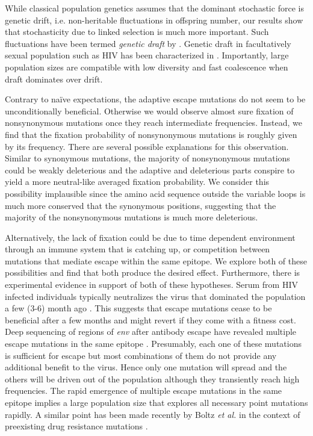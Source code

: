 \documentclass[rmp, twocolumn]{revtex4}
\newcommand{\env}{\textit{env}}
\begin{document}
While classical population genetics assumes that the dominant stochastic force
is genetic drift, i.e. non-heritable fluctuations in offspring number, our
results show that stochasticity due to linked selection is much more important.
Such fluctuations have been termed \emph{genetic draft} by
\citet{gillespie_genetic_2000}. Genetic draft in facultatively sexual population
such as HIV has been characterized in \citep{neher_genetic_2011}. Importantly,
large population sizes are compatible with low diversity and fast coalescence
when draft dominates over drift.

Contrary to na\"ive expectations, the adaptive escape mutations do not seem to
be unconditionally beneficial. Otherwise we would observe almost sure fixation
of nonsynonymous mutations once they reach intermediate frequencies. Instead, we
find that the fixation probability of nonsynonymous mutations is roughly given
by its frequency. There are several possible explanations for this observation.
Similar to synonymous mutations, the majority of nonsynonymous mutations could
be weakly deleterious and the adaptive and deleterious parts conspire to yield a
more neutral-like averaged fixation probability. We consider this possibility
implausible since the amino acid sequence outside the variable loops is much
more conserved that the synonymous positions, suggesting that the majority of
the nonsynonymous mutations is much more deleterious. 

Alternatively, the lack of fixation could be due to time dependent environment
through an immune system that is catching up, or competition between mutations
that mediate escape within the same epitope. We explore both of these
possibilities and find that both produce the desired effect. Furthermore, there
is experimental evidence in support of both of these hypotheses. Serum from HIV
infected individuals typically neutralizes the virus that dominated the
population a few (3-6) month ago \citep{richman_rapid_2003}. This suggests that
escape mutations cease to be beneficial after a few months and might revert if
they come with a fitness cost. Deep sequencing of regions of \env{} after
antibody escape have revealed multiple escape mutations in the same epitope
\citep{moore_limited_2009, bar_early_2012}. Presumably, each one of these
mutations is sufficient for escape but most combinations of them do not provide
any additional benefit to the virus. Hence only one mutation will spread and the
others will be driven out of the population although they transiently reach high
frequencies. The rapid emergence of multiple escape mutations in the same
epitope implies a large population size that explores all necessary point
mutations rapidly. A similar point has been made recently by Boltz {\it et al.}
in the context of preexisting drug resistance mutations
\citep{boltz_ultrasensitive_2012}. 
\end{document}
